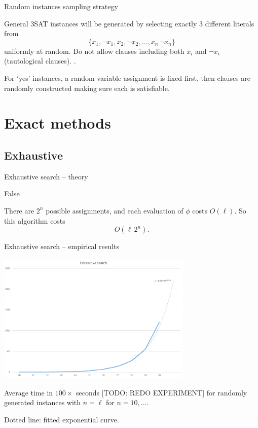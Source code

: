 \documentclass[aspectratio=169, compress, xcolor=table,xcolor=dvipsnames]{beamer}
\begin{document}
\begin{frame}
{Random instances sampling strategy}

General 3SAT instances will be generated by selecting exactly 3 different literals from
\[\{x_1, \lnot x_1, x_2, \lnot x_2, \ldots, x_n\, \lnot x_n\}\]
uniformly at random.
Do not allow clauses including both $x_i$ and $\lnot x_i$ (tautological clauses).
\cite{sls book}.

\vfill

For `yes' instances, a random variable assignment is fixed first, then clauses are randomly constructed making sure each is satisfiable.

\end{frame}

%
%
%
%

\section{Exact methods}
\subsection{Exhaustive}

\begin{frame}
{Exhaustive search -- theory}

\begin{algorithmic}[1]\sffamily
{}
	\EndIf
\EndFor
\State \Return False
\end{algorithmic}

\vfill

There are $2^n$ possible assignments, and each  evaluation of $\phi$ costs $O(\ell)$. So this algorithm costs \[O(\ell\, 2^n).\]
\end{frame}

\begin{frame}
{Exhaustive search -- empirical results}

\begin{center}
\includegraphics[width=0.7\textwidth]{img/exh2}
\end{center}

Average time in $100\times$ seconds [TODO: REDO EXPERIMENT] for randomly generated instances with $n=\ell$ for $n=10,\ldots$.

Dotted line: fitted exponential curve.

\end{frame}
\end{document}
